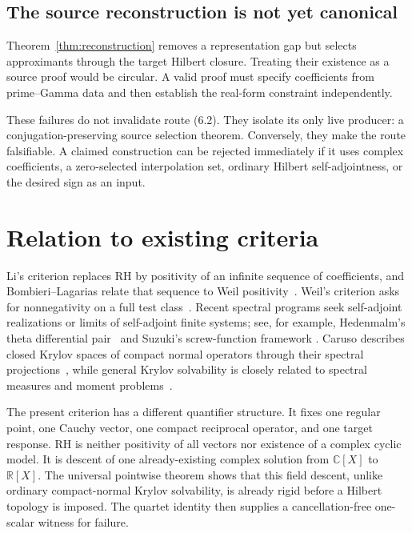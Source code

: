 \documentclass[11pt]{article}
\theoremstyle{definition}
\theoremstyle{remark}
\newcommand{\C}{\mathbb C}
\newcommand{\R}{\mathbb R}
\begin{document}
\subsection*{The source reconstruction is not yet canonical}
Theorem~\ref{thm:reconstruction} removes a representation gap but selects approximants through
the target Hilbert closure.  Treating their existence as a source proof would be circular.  A
valid proof must specify coefficients from prime--Gamma data and then establish the real-form
constraint independently.

These failures do not invalidate route (6.2).  They isolate its only live producer: a
conjugation-preserving source selection theorem.  Conversely, they make the route falsifiable.
A claimed construction can be rejected immediately if it uses complex coefficients, a
zero-selected interpolation set, ordinary Hilbert self-adjointness, or the desired sign as an
input.

\section{Relation to existing criteria}

Li's criterion replaces RH by positivity of an infinite sequence of coefficients, and
Bombieri--Lagarias relate that sequence to Weil positivity~\cite{Li1997,BombieriLagarias1999}.
Weil's criterion asks for nonnegativity on a full test class~\cite{Weil1952}.  Recent spectral
programs seek self-adjoint realizations or limits of self-adjoint finite systems; see, for example,
Hedenmalm's theta differential pair~\cite{Hedenmalm2026} and Suzuki's screw-function framework
\cite{Suzuki2026}.  Caruso describes closed Krylov spaces of compact normal operators through
their spectral projections~\cite{Caruso2023}, while general Krylov solvability is closely related
to spectral measures and moment problems~\cite{Caruso2024}.

The present criterion has a different quantifier structure.  It fixes one regular point, one
Cauchy vector, one compact reciprocal operator, and one target response.  RH is neither positivity
of all vectors nor existence of a complex cyclic model.  It is descent of one already-existing
complex solution from $\C[X]$ to $\R[X]$.  The universal pointwise theorem shows that this field
descent, unlike ordinary compact-normal Krylov solvability, is already rigid before a Hilbert
topology is imposed.  The quartet identity then supplies a cancellation-free one-scalar witness
for failure.
\end{document}
